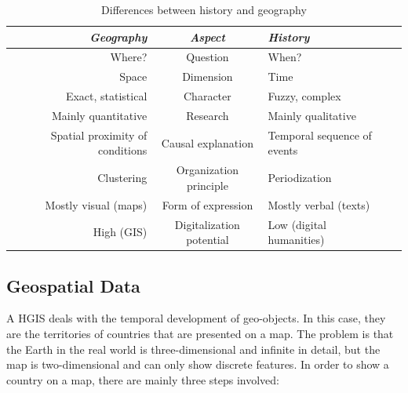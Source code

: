 \begin{table}[ht]
\begin{center}
\begin{tabular}{p{0px} r c l p{0px}}
    \toprule
    & \emph{Geography}
    & \emph{Aspect}
    & \emph{History}
    & \\
    \midrule
    & Where?
    & Question
    & When?
    & \\

    & Space
    & Dimension
    & Time
    & \\

    & Exact, statistical
    & Character
    & Fuzzy, complex
    & \\

    & Mainly quantitative
    & Research
    & Mainly qualitative
    & \\

    & Spatial proximity of conditions
    & Causal explanation
    & Temporal sequence of events
    & \\

    & Clustering
    & Organization principle
    & Periodization
    & \\

    & Mostly visual (maps)
    & Form of expression
    & Mostly verbal (texts)
    & \\

    & High (GIS)
    & Digitalization potential
    & Low (digital humanities)
    & \\

    \bottomrule
\end{tabular}
\caption{Differences between history and geography \cite[pp. 2-4]{knowles2008placing}}
\label{tab:history_vs_geography}
\end{center}
\end{table}


\subsection{Geospatial Data} %
\label{sub:geospatial_data}

A HGIS deals with the temporal development of geo-objects. In this case, they are the territories of countries that are presented on a map. The problem is that the Earth in the real world is three-dimensional and infinite in detail, but the map is two-dimensional and can only show discrete features. In order to show a country on a map, there are mainly three steps involved:

